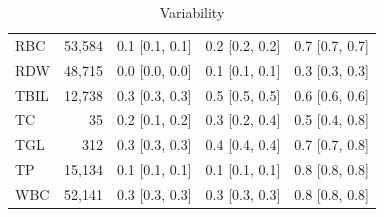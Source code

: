 \begin{table}[ht]
\begin{tabular}{lrrrr}
RBC & 53,584 & 0.1 [0.1, 0.1] & 0.2 [0.2, 0.2] & 0.7 [0.7, 0.7] \\
RDW & 48,715 & 0.0 [0.0, 0.0] & 0.1 [0.1, 0.1] & 0.3 [0.3, 0.3] \\
TBIL & 12,738 & 0.3 [0.3, 0.3] & 0.5 [0.5, 0.5] & 0.6 [0.6, 0.6] \\
TC & 35 & 0.2 [0.1, 0.2] & 0.3 [0.2, 0.4] & 0.5 [0.4, 0.8] \\
TGL & 312 & 0.3 [0.3, 0.3] & 0.4 [0.4, 0.4] & 0.7 [0.7, 0.8] \\
TP & 15,134 & 0.1 [0.1, 0.1] & 0.1 [0.1, 0.1] & 0.8 [0.8, 0.8] \\
WBC & 52,141 & 0.3 [0.3, 0.3] & 0.3 [0.3, 0.3] & 0.8 [0.8, 0.8] \\
\bottomrule
\end{tabular}
\caption{Variability}
\label{tab:variability}
\end{table}